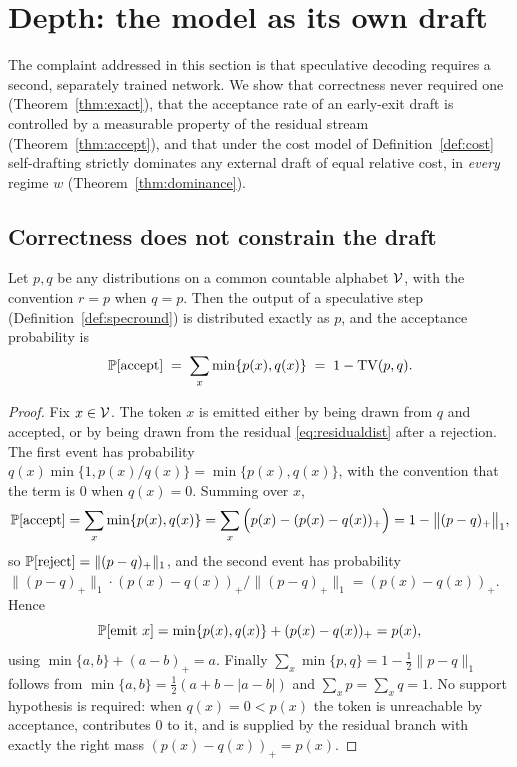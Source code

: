 \section{Depth: the model as its own draft}
\label{sec:depth}

The complaint addressed in this section is that speculative decoding
\cite{leviathan2023,chen2023} requires a second, separately trained network. We
show that correctness never required one (Theorem~\ref{thm:exact}), that the
acceptance rate of an early-exit draft is controlled by a measurable property of
the residual stream (Theorem~\ref{thm:accept}), and that under the cost model of
Definition~\ref{def:cost} self-drafting strictly dominates any external draft of
equal relative cost, in \emph{every} regime $w$ (Theorem~\ref{thm:dominance}).

\subsection{Correctness does not constrain the draft}

\begin{theorem}
\label{thm:exact}
Let $p, q$ be any distributions on a common countable alphabet $\mathcal{V}$, with
the convention $r = p$ when $q = p$. Then the output of a speculative step
(Definition~\ref{def:specround}) is distributed exactly as $p$, and the
acceptance probability is
\begin{equation}
  \mathbb{P}[\text{accept}] \;=\; \sum_{x} \min\{p(x), q(x)\} \;=\; 1 - \mathrm{TV}(p,q) .
  \label{eq:alpha}
\end{equation}
\end{theorem}

\begin{proof}
Fix $x \in \mathcal{V}$. The token $x$ is emitted either by being drawn from $q$ and
accepted, or by being drawn from the residual \eqref{eq:residualdist} after a
rejection. The first event has probability
$q(x)\min\{1, p(x)/q(x)\} = \min\{p(x), q(x)\}$, with the convention that the
term is $0$ when $q(x) = 0$. Summing over $x$,
\begin{equation}
  \mathbb{P}[\text{accept}] = \sum_x \min\{p(x),q(x)\}
  = \sum_x \Big( p(x) - (p(x)-q(x))_+ \Big)
  = 1 - \big\|(p-q)_+\big\|_1 ,
\end{equation}
so $\mathbb{P}[\text{reject}] = \|(p-q)_+\|_1$, and the second event has probability
$\|(p-q)_+\|_1 \cdot (p(x)-q(x))_+ / \|(p-q)_+\|_1 = (p(x)-q(x))_+$. Hence
\begin{equation}
  \mathbb{P}[\text{emit } x] = \min\{p(x),q(x)\} + (p(x)-q(x))_+ = p(x),
\end{equation}
using $\min\{a,b\} + (a-b)_+ = a$. Finally
$\sum_x \min\{p,q\} = 1 - \tfrac12\|p-q\|_1$ follows from
$\min\{a,b\} = \tfrac12(a + b - |a-b|)$ and $\sum_x p = \sum_x q = 1$.
No support hypothesis is required: when $q(x) = 0 < p(x)$ the token is
unreachable by acceptance, contributes $0$ to it, and is supplied by the residual
branch with exactly the right mass $(p(x)-q(x))_+ = p(x)$.
\end{proof}

